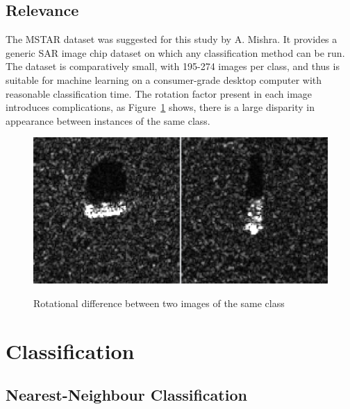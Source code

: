 \subsection{Relevance}
The MSTAR dataset was suggested for this study by A. Mishra. It provides a generic SAR image chip dataset on which any classification method can be run. The dataset is comparatively small, with 195-274 images per class, and thus is suitable for machine learning on a consumer-grade desktop computer with reasonable classification time. The rotation factor present in each image introduces complications, as Figure~\ref{fig:sar_differences} shows, there is a large disparity in appearance between instances of the same class.

\begin{figure}
	\centering
	\includegraphics[width=\textwidth]{figures/sar_differences}
	\label{fig:sar_differences}
	\caption{Rotational difference between two images of the same class}
	\centering
\end{figure}



\section{Classification}


\subsection{Nearest-Neighbour Classification}\label{lit:nn}
